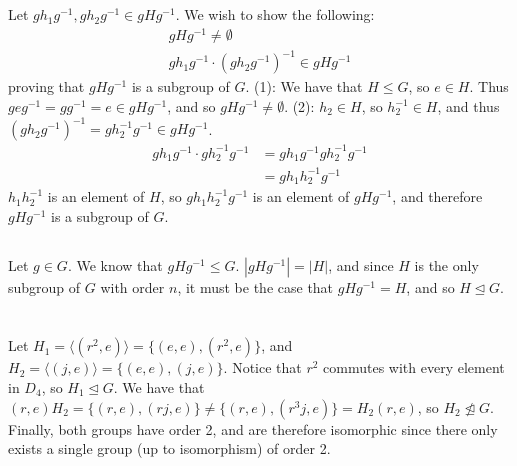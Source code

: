 \documentclass[11pt]{article}
\begin{document}
\renewcommand{\thesubsection}{\thesection.\alph{subsection}}


\section{} %
\subsection{} %
Let $gh_1g^{-1},gh_2g^{-1}\in gHg^{-1}$. We wish to show the following:
\begin{align}
	gHg^{-1}\neq\emptyset\\
	gh_1g^{-1}\cdot(gh_2g^{-1})^{-1}\in gHg^{-1}
\end{align}
proving that $gHg^{-1}$ is a subgroup of $G$.
\newline
\newline
(1): We have that $H\le G$, so $e\in H$. Thus $geg^{-1}=gg^{-1}=e\in gHg^{-1}$, and so
$gHg^{-1}\neq\emptyset$.
\newline
\newline
(2): $h_2\in H$, so $h_2^{-1}\in H$, and thus $(gh_2g^{-1})^{-1}=gh_2^{-1}g^{-1}\in gHg^{-1}$.
\begin{align*}
	gh_1g^{-1}\cdot gh_2^{-1}g^{-1} &= gh_1g^{-1}gh_2^{-1}g^{-1}\\
	&=gh_1h_2^{-1}g^{-1}
\end{align*}
$h_1h_2^{-1}$ is an element of $H$, so $gh_1h_2^{-1}g^{-1}$ is an element of
$gHg^{-1}$, and therefore $gHg^{-1}$ is a subgroup of $G$.


\subsection{} %
Let $g\in G$. We know that $gHg^{-1}\le G$. $|gHg^{-1}|=|H|$, and since $H$ is
the only subgroup of $G$ with order $n$, it must be the case that $gHg^{-1}=H$,
and so $H\trianglelefteq G$.


\section{} %
Let $H_1=\langle(r^2,e)\rangle=\{(e,e),(r^2,e)\}$, and
$H_2=\langle(j,e)\rangle=\{(e,e),(j,e)\}$.
\newline
\newline
Notice that $r^2$ commutes with every element in $D_4$, so $H_1\trianglelefteq G$.
\newline
\newline
We have that $(r,e)H_2=\{(r,e),(rj,e)\}\neq\{(r,e),(r^3j,e)\}=H_2(r,e)$, so
$H_2\not\trianglelefteq G$.
\newline
\newline
Finally, both groups have order 2, and are therefore isomorphic since there only
exists a single group (up to isomorphism) of order 2.
\end{document}
